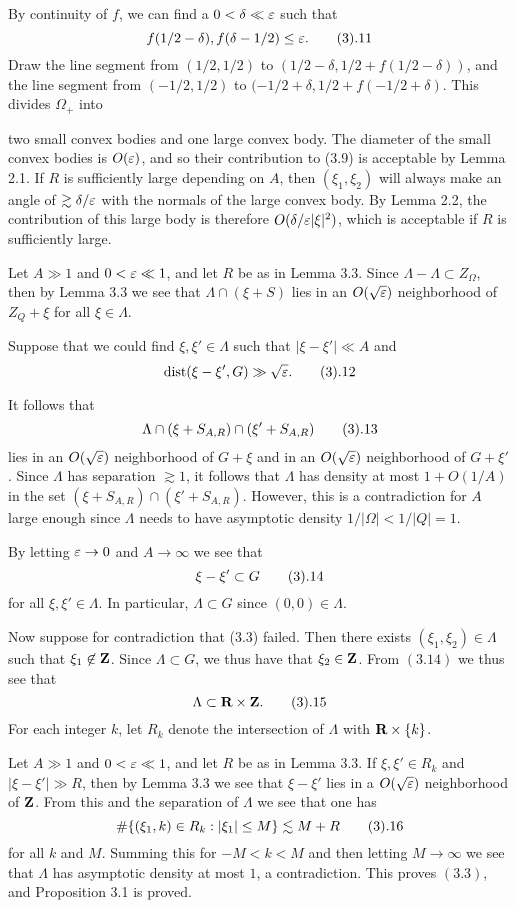 By continuity of $f$, we can find a $0 < \delta \ll \varepsilon$ such that
$$ f(1/2 - \delta), f(\delta - 1/2) \leq \eps. \tag3.11$$
Draw the line segment from $(1/2,1/2)$ to $(1/2-\delta,
1/2+f(1/2-\delta))$, and the line segment from $(-1/2,1/2)$ to
$(-1/2+\delta, 1/2+f(-1/2+\delta)$. This divides $\Omega_+$ into

two small convex bodies and one large convex body. The diameter
of the small convex bodies is $O(\varepsilon)$, and so their
contribution to (3.9) is acceptable by Lemma 2.1. If $R$ is
sufficiently large depending on $A$, then $(\xi_1, \xi_2)$ will
always make an angle of $\gtrsim \delta/\varepsilon$ with the normals
of the large convex body. By Lemma 2.2, the contribution of this
large body is therefore $O(\delta/\varepsilon |\xi|^2)$, which is
acceptable if $R$ is sufficiently large.
\enddemo

Let $A \gg 1$ and $0 < \varepsilon \ll 1$, and let $R$ be as in Lemma
3.3. Since $\Lambda - \Lambda \subset Z_\Omega$, then by Lemma
3.3 we see that $\Lambda \cap (\xi + S)$ lies in an
$O(\sqrt{\varepsilon})$ neighborhood of $Z_Q + \xi$ for all $\xi \in
\Lambda$.

Suppose that we could find $\xi, \xi' \in \Lambda$
such that $|\xi - \xi'| \ll A$ and
$$ \dist(\xi - \xi', G) \gg \sqrt{\eps}. \tag3.12$$

It follows that
$$ \Lambda \cap (\xi + S_{A,R}) \cap (\xi' + S_{A,R}) \tag3.13$$
lies in an $O(\sqrt{\varepsilon})$ neighborhood of $G + \xi$ and in an
$O(\sqrt{\varepsilon})$ neighborhood of $G + \xi'$.  Since $\Lambda$
has separation $\gtrsim 1$, it follows that $\Lambda$ has
density at most $1 + O(1/A)$ in the set $(\xi + S_{A,R}) \cap
(\xi' + S_{A,R})$.  However, this is a contradiction for $A$
large enough since $\Lambda$ needs to have asymptotic density
$1/|\Omega|<1/|Q|=1$.

By letting $\varepsilon \to 0$ and $A \to \infty$ we see that
$$ \xi - \xi' \subset G \tag 3.14$$
for all $\xi, \xi' \in \Lambda$.  In particular, $\Lambda \subset G$
since $(0,0) \in \Lambda$.

Now suppose for contradiction that (3.3) failed.
Then there exists $(\xi_1, \xi_2) \in
\Lambda$ such that $\xi_1 \not \in \hbox{{\bf Z}}$. Since $\Lambda \subset G$,
we thus have that
$\xi_2 \in \hbox{{\bf Z}}$.  From $(3.14)$ we thus see that
$$ \Lambda \subset \R \times \Z. \tag3.15$$
For each integer $k$, let $R_k$ denote the intersection of
$\Lambda$ with
$\hbox{{\bf R}} \times \{k\}$.

Let $A \gg 1$ and $0<\varepsilon \ll 1$, and let $R$ be as in Lemma
3.3. If $\xi, \xi' \in R_k$ and $|\xi - \xi'| \gg R$, then by
Lemma 3.3 we see that $\xi - \xi'$ lies in a $O(\sqrt{\varepsilon})$
neighborhood of $\hbox{{\bf Z}}$.  From this and the separation of $\Lambda$
we see that one has
$$ \# \{ (\xi_1, k) \in R_k: |\xi_1| \leq M \} \lesssim M+R \tag3.16$$
for all $k$ and $M$. Summing this for $-M<k<M$ and then letting
$M \to \infty$ we see that $\Lambda$ has asymptotic density at
most $1$, a contradiction. This proves $(3.3)$, and Proposition
3.1 is proved.

